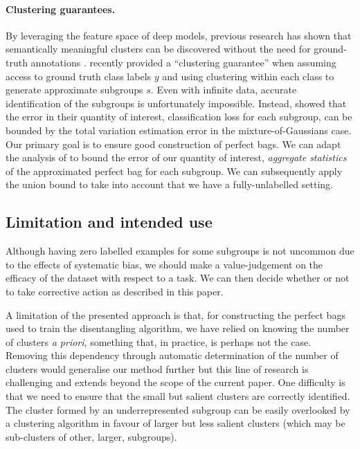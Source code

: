 \paragraph{Clustering guarantees.}
By leveraging the feature space of deep models, previous research has shown that semantically meaningful clusters can be discovered without the need for ground-truth annotations
\citep[for example][]{RayDunCarRe20,GanVanGeoProetal20,SohDunAngGuetal20,HanRebEhrVedetal20}.
\citet{SohDunAngGuetal20} recently provided a ``clustering guarantee'' when assuming access to ground truth class labels $y$ and using clustering within each class to generate approximate subgroups $s$.  
%
Even with infinite data, accurate identification of the subgroups is unfortunately impossible. 
%
Instead, \citet{SohDunAngGuetal20} showed that the error in their quantity of interest, classification loss for each subgroup, can be bounded by the total variation estimation error in the mixture-of-Gaussians case.   
%
Our primary goal is to ensure good construction of perfect bags.
We can adapt the analysis of \citet{SohDunAngGuetal20} to bound the error of our quantity of interest, \emph{aggregate statistics} of the approximated perfect bag for each subgroup.
%
We can subsequently apply the union bound to take into account that we have a fully-unlabelled setting.


\subsection{Limitation and intended use}
\label{sec:limitations}
%
Although having zero labelled examples for some subgroups is not uncommon due to the effects of systematic bias,
we should make a value-judgement on the efficacy of the dataset with respect to a task.
%
We can then decide whether or not to take corrective action as described in this paper.

A limitation of the presented approach is that, for constructing the perfect bags used to train the disentangling algorithm, we have relied on knowing the number of clusters \emph{a priori}, something that, in practice, is perhaps not the case. 
%
Removing this dependency through automatic determination of the number of clusters would generalise our method further but this line of research is challenging and extends beyond the scope of the current paper. 
%
One difficulty is that we need to ensure that the small but salient clusters are correctly identified. 
%
The cluster formed by an underrepresented subgroup can be easily overlooked by a clustering algorithm in favour of larger but less salient clusters
(which may be sub-clusters of other, larger, subgroups). 

